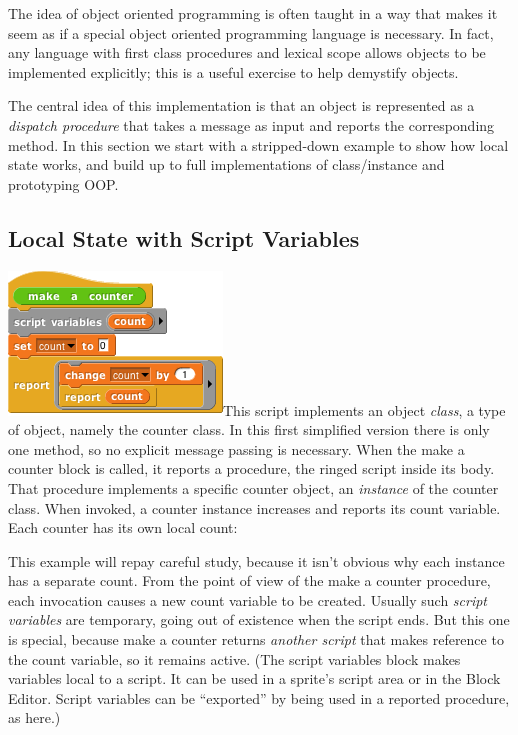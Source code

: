The idea of object oriented programming is often taught in a way that
makes it seem as if a special object oriented programming language is
necessary. In fact, any language with ﬁrst class procedures and lexical
scope allows objects to be implemented explicitly; this is a useful
exercise to help demystify objects.

The central idea of this implementation is that an object is represented
as a \emph{dispatch procedure} that takes a message as input and reports
the corresponding method. In this section we start with a stripped-down
example to show how local state works, and build up to full
implementations of class/instance and prototyping OOP.

\subsection{Local State with Script
Variables}\label{local-state-with-script-variables}

\includegraphics[width=2.23958in,height=1.51042in]{media/image852.png}This
script implements an object \emph{class}, a type of object, namely the
counter class. In this ﬁrst simplified version there is only one method,
so no explicit message passing is necessary. When the make a counter
block is called, it reports a procedure, the ringed script inside its
body. That procedure implements a specific counter object, an
\emph{instance} of the counter class. When invoked, a counter instance
increases and reports its count variable. Each counter has its own local
count:

This example will repay careful study, because it isn't obvious why each
instance has a separate count. From the point of view of the make a
counter procedure, each invocation causes a new count variable to be
created. Usually such \emph{script variables} are temporary, going out
of existence when the script ends. But this one is special, because make
a counter returns \emph{another script} that makes reference to the
count variable, so it remains active. (The script variables block makes
variables local to a script. It can be used in a sprite's script area or
in the Block Editor. Script variables can be ``exported'' by being used
in a reported procedure, as here.)

